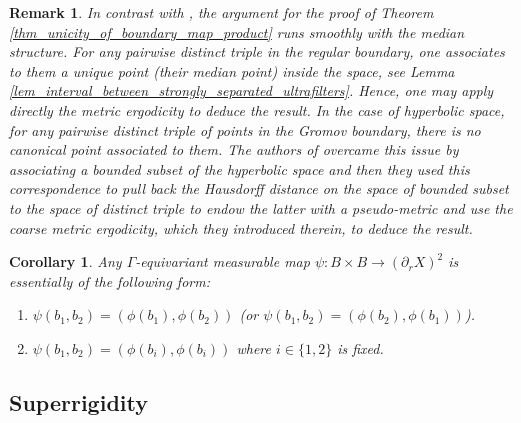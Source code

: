 \documentclass{amsart}
\numberwithin{equation}{section}
\newtheorem{cor}[thm]{Corollary}
\newtheorem{rmk}[thm]{Remark}
\theoremstyle{definition}
\begin{document}
\begin{rmk}
    In contrast with \cite{BCFS}, the argument for the proof of Theorem \ref{thm_unicity_of_boundary_map_product} runs smoothly with the median structure. For any pairwise distinct triple in the regular boundary, one associates to them a unique point (their median point) inside the space, see Lemma \ref{lem_interval_between_strongly_separated_ultrafilters}. Hence, one may apply directly the metric ergodicity to deduce the result. In the case of hyperbolic space, for any pairwise distinct triple of points in the Gromov boundary, there is no canonical point associated to them. The authors of \cite{BCFS} overcame this issue by associating a bounded subset of the hyperbolic space and then they used this correspondence to pull back the Hausdorff distance on the space of bounded subset to the space of distinct triple to endow the latter with a pseudo-metric and use the coarse metric ergodicity, which they introduced therein, to deduce the result. 
\end{rmk}
 \begin{cor}\label{cor_boundary_map_into_product}
Any $\Gamma$-equivariant measurable map $\psi: B\times B\rightarrow (\partial_r X)^2$ is essentially of the following form: 
\begin{enumerate}
 \item $\psi(b_1,b_2)=(\phi(b_1),\phi(b_2))$ (or $\psi(b_1,b_2)=(\phi(b_2),\phi(b_1))$).
 \item $\psi(b_1,b_2)=(\phi(b_i),\phi(b_i))$ where $i\in\{1,2\}$ is fixed.
\end{enumerate}
\end{cor}


\subsection{Superrigidity}
\end{document}
